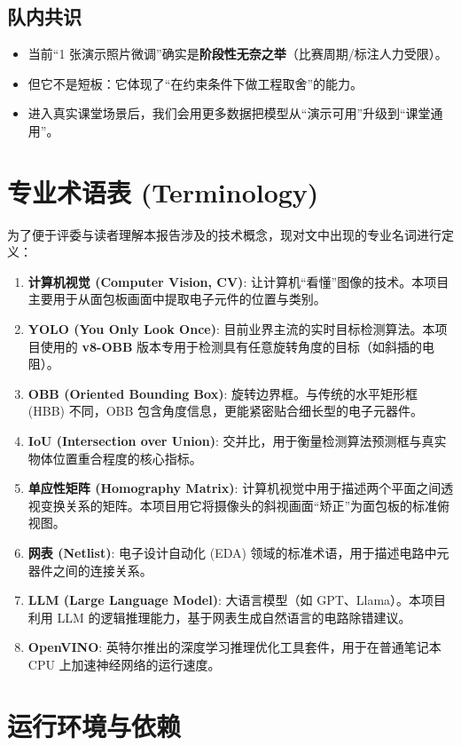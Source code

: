 \documentclass[a4paper,AutoFakeBold,oneside,12pt]{book}
\begin{document}
\subsection{队内共识}
\begin{itemize}
    \item 当前“1 张演示照片微调”确实是\textbf{阶段性无奈之举}（比赛周期/标注人力受限）。
    \item 但它不是短板：它体现了“在约束条件下做工程取舍”的能力。
    \item 进入真实课堂场景后，我们会用更多数据把模型从“演示可用”升级到“课堂通用”。
\end{itemize}

\section{专业术语表 (Terminology)}
为了便于评委与读者理解本报告涉及的技术概念，现对文中出现的专业名词进行定义：
\begin{enumerate}
    \item \textbf{计算机视觉 (Computer Vision, CV)}: 让计算机“看懂”图像的技术。本项目主要用于从面包板画面中提取电子元件的位置与类别。
    \item \textbf{YOLO (You Only Look Once)}: 目前业界主流的实时目标检测算法。本项目使用的 \textbf{v8-OBB} 版本专用于检测具有任意旋转角度的目标（如斜插的电阻）。
    \item \textbf{OBB (Oriented Bounding Box)}: 旋转边界框。与传统的水平矩形框 (HBB) 不同，OBB 包含角度信息，更能紧密贴合细长型的电子元器件。
    \item \textbf{IoU (Intersection over Union)}: 交并比，用于衡量检测算法预测框与真实物体位置重合程度的核心指标。
    \item \textbf{单应性矩阵 (Homography Matrix)}: 计算机视觉中用于描述两个平面之间透视变换关系的矩阵。本项目用它将摄像头的斜视画面“矫正”为面包板的标准俯视图。
    \item \textbf{网表 (Netlist)}: 电子设计自动化 (EDA) 领域的标准术语，用于描述电路中元器件之间的连接关系。
    \item \textbf{LLM (Large Language Model)}: 大语言模型（如 GPT、Llama）。本项目利用 LLM 的逻辑推理能力，基于网表生成自然语言的电路除错建议。
    \item \textbf{OpenVINO}: 英特尔推出的深度学习推理优化工具套件，用于在普通笔记本 CPU 上加速神经网络的运行速度。
\end{enumerate}

\section{运行环境与依赖}
\end{document}
